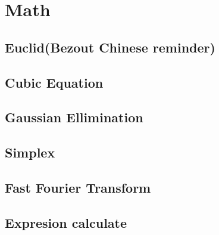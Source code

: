 \newpage
\section{Math}

\subsection{Euclid(Bezout Chinese reminder)} 
 

\subsection{Cubic Equation}


\subsection{Gaussian Ellimination}


\subsection{Simplex}


\subsection{Fast Fourier Transform}


\subsection{Expresion calculate}
